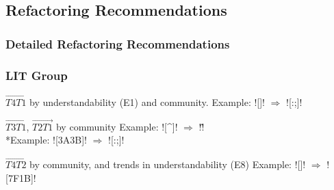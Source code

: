 \subsection{Refactoring Recommendations}

{
\begin{frame}
\frametitle{Detailed Refactoring Recommendations}
\end{frame}
}
\note[itemize]{
    \item
}


\begin{frame}[fragile]
\frametitle{LIT Group}
\begin{block}{$\overrightarrow{T4 T1}$ by understandability (E1) and community.}
Example: \cverb![]! $\Rightarrow$ \cverb![:;]!
\end{block}

\begin{block}{$\overrightarrow{T3 T1}$, $\overrightarrow{T2 T1}$ by community}
Example: \cverb![^]! $\Rightarrow$ \cverb!\^!
\\*Example: \cverb![\x3A\x3B]! $\Rightarrow$ \cverb![:;]!
\end{block}

\begin{block}{$\overrightarrow{T4 T2}$ by community, and trends in understandability (E8) }
Example: \cverb![]! $\Rightarrow$ \cverb![\x7F\x1B]!
\end{block}

\end{frame}


